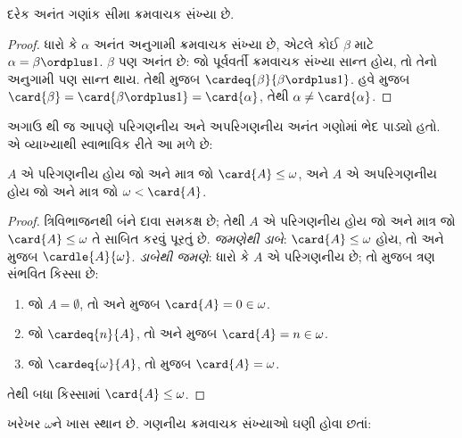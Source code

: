 \begin{cor}
દરેક અનંત ગણાંક સીમા ક્રમવાચક સંખ્યા છે.
\end{cor}

\begin{proof}
ધારો કે $\alpha$ અનંત અનુગામી ક્રમવાચક સંખ્યા છે,
એટલે કોઈ $\beta$ માટે $\alpha = \beta
\ordplus 1$. $\beta$ પણ અનંત છે: જો પૂર્વવર્તી
ક્રમવાચક સંખ્યા સાન્ત હોય, તો તેનો અનુગામી પણ
સાન્ત થાય. તેથી
મુજબ $\cardeq{\beta}{\beta \ordplus 1}$.
હવે 
મુજબ $\card{\beta} = \card{\beta\ordplus 1} =
\card{\alpha}$, તેથી $\alpha \neq \card{\alpha}$.
\end{proof}

અગાઉ થી જ
આપણે પરિગણનીય અને અપરિગણનીય અનંત
ગણોમાં ભેદ પાડ્યો હતો. એ વ્યાખ્યાથી સ્વાભાવિક રીતે
આ મળે છે:

\begin{prop}
$A$ એ પરિગણનીય હોય જો અને માત્ર જો
$\card{A} \leq \omega$, અને $A$ એ
અપરિગણનીય હોય જો અને માત્ર જો
$\omega < \card{A}$.
\end{prop}

\begin{proof}
ત્રિવિભાજનથી બંને દાવા સમકક્ષ છે; તેથી
$A$ એ પરિગણનીય હોય જો અને માત્ર જો
$\card{A} \leq \omega$ તે સાબિત કરવું પૂરતું છે.
\emph{જમણેથી ડાબે}: $\card{A} \leq \omega$ હોય, તો
અને  મુજબ
$\cardle{A}{\omega}$.
\emph{ડાબેથી જમણે}: ધારો કે $A$ એ
પરિગણનીય છે; તો
 મુજબ
ત્રણ સંભવિત કિસ્સા છે:
\begin{enumerate}
	\item જો $A = \emptyset$, તો
	 અને
	મુજબ $\card{A} = 0 \in \omega$.
	\item જો $\cardeq{n}{A}$, તો
	 અને
	મુજબ $\card{A} = n \in \omega$.
	\item જો $\cardeq{\omega}{A}$, તો
	 મુજબ $\card{A} = \omega$.
\end{enumerate}
તેથી બધા કિસ્સામાં $\card{A} \leq \omega$.
\end{proof}
\noindent
ખરેખર $\omega$ને ખાસ સ્થાન છે. ગણનીય ક્રમવાચક
સંખ્યાઓ ઘણી હોવા છતાં:


